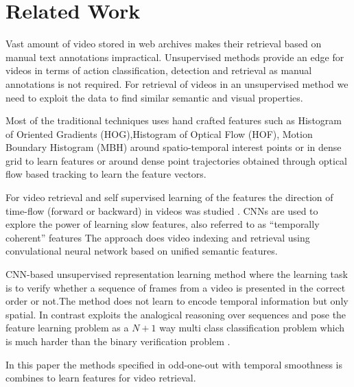 \section{Related Work}\label{sec:related}
Vast amount of video stored in web archives makes their retrieval based on manual text annotations impractical.
Unsupervised methods provide an edge for videos in terms of action classification, detection and retrieval as manual annotations is not required. 
For retrieval of videos in an unsupervised method we need to exploit the data to find similar semantic and visual properties.

Most of the traditional techniques uses hand crafted features such as Histogram of Oriented Gradients (HOG),Histogram of Optical Flow (HOF), Motion Boundary Histogram
(MBH) around spatio-temporal interest points \cite{Laptev08learningrealistic} or in dense grid to learn features or around dense point trajectories obtained through optical flow based tracking to learn the feature vectors. 

For video retrieval and self supervised learning of the features the direction of time-flow (forward or backward) in videos was studied \cite{Pickupetal14}. CNNs are used to explore the power of learning
slow features, also referred to as “temporally coherent” features\cite{Mobahi2009}
The approach\cite{podlesnaya2016retrieval} does video indexing and retrieval using convulational neural network  based on unified semantic features.

CNN-based unsupervised representation learning method \cite{Misra2016ShuffleAL}where the learning task is to verify whether a sequence
of frames from a video is presented in the correct order or
not.The method does not learn to encode temporal
information but only spatial. In contrast \cite{fernando2017self}
exploits the analogical reasoning over sequences and pose
the feature learning problem as a  $ N + 1 $ way multi class
classification problem which is much harder than the binary
verification problem .

In this paper the methods specified in odd-one-out \cite{fernando2017self} with temporal smoothness is combines to learn features for video retrieval.